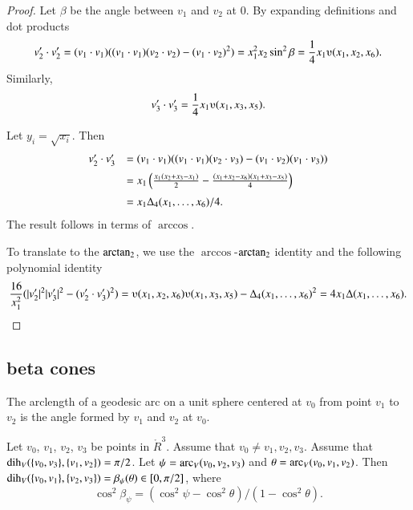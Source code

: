 \begin{proof}
Let $\beta$ be the angle between $v_1$ and $v_2$ at $0$.
    By expanding definitions and dot products
    $$
    v'_2\cdot v'_2 = (v_1\cdot v_1) ((v_1\cdot v_1)(v_2\cdot v_2) -
    (v_1\cdot v_2)^2) =  x_1^2 x_2 \sin^2 \beta = \frac{1}{4}
    x_1
    \ups(x_1,x_2,x_6).
    $$
    Similarly,
    $$v'_3 \cdot v'_3 = \frac{1}{4} x_1 \ups(x_1,x_3,x_5).$$

Let $y_i = \sqrt{x_i}$. Then
    $$\begin{array}{lll}
    v'_2\cdot v'_3 &= (v_1\cdot v_1)((v_1\cdot v_1)(v_2\cdot v_3) -
    (v_1\cdot v_2)(v_1\cdot v_3) ) \vspace{6pt} \\  &
    = x_1 \left(\frac{ x_1 (x_2 + x_3 -
    x_1)}{2} - \frac{(x_1 + x_2 - x_6)(x_1 + x_3 -
    x_5)}{4} \right)\vspace{6pt}\\&
    = {x_1\Delta_4(x_1,\ldots,x_6)}/{4}.
    \end{array}
    $$
The result follows in terms of $\arccos$.

To translate to the ${\operatorname{arctan_2}}$, 
we use the $\arccos$-${\operatorname{arctan_2}}$ identity
and the following polynomial identity
    $$
    \frac{16}{x_1^2}(|v'_2|^2 |v'_3|^2 - (v'_2\cdot v'_3)^2) =
    \ups(x_1,x_2,x_6)\ups(x_1,x_3,x_5) - \Delta_4(x_1,\ldots,x_6)^2
    = 4 x_1 \Delta(x_1,\ldots,x_6).
    $$
\end{proof}


\subsection{beta cones }

\begin{definition}  The arclength of a geodesic arc on a unit sphere
centered at $v_0$ from point $v_1$ to $v_2$ is the angle formed by
$v_1$ and $v_2$ at $v_0$.
\end{definition}


\begin{lemma}\label{lemma:beta-cone}
Let $v_0$, $v_1$, $v_2$, $v_3$ be points in $\ring{R}^3$.   
Assume that $v_0\ne v_1,v_2,v_3$.  Assume
that $\operatorname{dih}_V(\{v_0,v_3\},\{v_1,v_2\})=\pi/2$.  Let
$\psi = \operatorname{arc}_V(v_0,v_2,v_3)$ and $\theta=\operatorname{arc}_V(v_0,v_1,v_2)$. 
Then $\operatorname{dih}_V(\{v_0,v_1\},\{v_2,v_3\}) = \beta_\psi(\theta)\in[0,\pi/2]$,
where
  $$
      \cos^2\beta_\psi = (\cos^2\psi-\cos^2\theta)/(1-\cos^2\theta).
  $$
\end{lemma}

